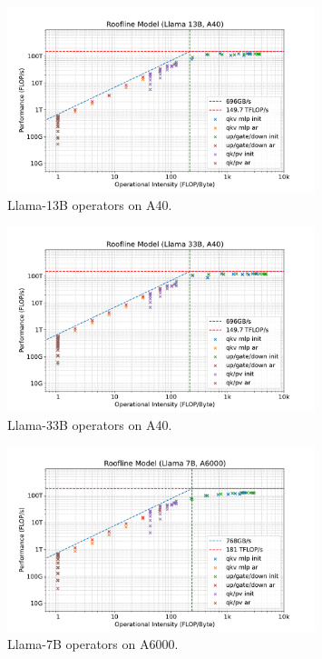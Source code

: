 \documentclass{article}
\theoremstyle{plain}
\theoremstyle{definition}
\theoremstyle{remark}
\begin{document}
\begin{figure}[h]
    \centering
    \includegraphics[width=0.8\textwidth]{llama13b-roofline-a40.pdf}
    \caption{Llama-13B operators on A40.}
    \label{fig:llama13b-roofline-a40}
\end{figure}


\begin{figure}[h]
    \centering
    \includegraphics[width=0.8\textwidth]{llama33b-roofline-a40.pdf}
    \caption{Llama-33B operators on A40.}
    \label{fig:llama33b-roofline-a40}
\end{figure}



\begin{figure}[h]
    \centering
    \includegraphics[width=0.8\textwidth]{llama7b-roofline-a6000.pdf}
    \caption{Llama-7B operators on A6000.}
    \label{fig:llama7b-roofline-a6000}
\end{figure}
\end{document}
